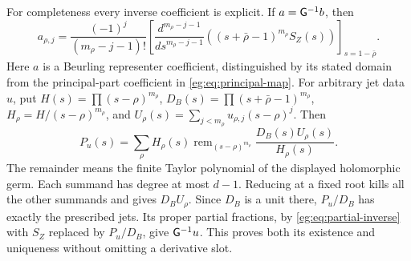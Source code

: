 For completeness every inverse coefficient is explicit. If $a=\mathsf G^{-1}b$,
then
\[
 a_{\rho,j}=\frac{(-1)^j}{(m_\rho-j-1)!}
 \left[\frac{d^{m_\rho-j-1}}{ds^{m_\rho-j-1}}
       ((s+\bar\rho-1)^{m_\rho}S_Z(s))\right]_{s=1-\bar\rho}.
 \tag{EG14}\label{eg:eq:partial-inverse}
\]
Here $a$ is a Beurling representer coefficient, distinguished by its
stated domain from the principal-part coefficient in \eqref{eg:eq:principal-map}.
For arbitrary jet data $u$, put
$H(s)=\prod(s-\rho)^{m_\rho}$,
$D_B(s)=\prod(s+\bar\rho-1)^{m_\rho}$,
$H_\rho=H/(s-\rho)^{m_\rho}$, and
$U_\rho(s)=\sum_{j<m_\rho}u_{\rho,j}(s-\rho)^j$. Then
\[
 P_u(s)=\sum_\rho H_\rho(s)
 \operatorname{rem}_{(s-\rho)^{m_\rho}}
                    \frac{D_B(s)U_\rho(s)}{H_\rho(s)}.
 \tag{EG15}\label{eg:eq:Hermite-inverse}
\]
The remainder means the finite Taylor polynomial of the displayed
holomorphic germ. Each summand has degree at most $d-1$. Reducing
at a fixed root kills all the other summands and gives $D_BU_\rho$.
Since $D_B$ is a unit there, $P_u/D_B$ has exactly the prescribed
jets. Its proper partial fractions, by \eqref{eg:eq:partial-inverse}
with $S_Z$ replaced by $P_u/D_B$, give $\mathsf G^{-1}u$. This proves
both its existence and uniqueness without omitting a derivative slot.

